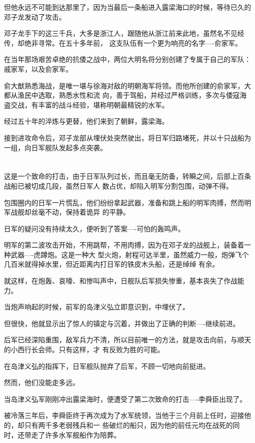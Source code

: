 \documentclass[11pt,a4paper,onecolumn]{article}
\begin{document}
但他永远不可能到达那里了，因为当最后一条船进入露梁海口的时候，等待已久的邓子龙发动了攻击。

邓子龙手下的这三千兵，大多是浙江人，跟随他从浙江前来此地，虽然名不见经传，却绝非寻常。在五十多年前，
这支队伍有一个更为响亮的名字----俞家军。

在当年那场艰苦卓绝的抗倭之战中，两位大明名将分别创建了专属于自己的军队：戚家军，以及俞家军。

俞大猷熟悉海战，是唯一堪与徐海对敌的明朝海军将领。而他所创建的俞家军，大都从渔民中选取，熟悉水性和流
向，善于驾船，并经过严格训练，多次与倭寇海盗交战，有丰富的战斗经验，堪称明朝最精锐的水军。

经过五十年的淬炼与更替，他们来到了朝鲜，露梁海。

接到进攻命令后，邓子龙部从埋伏处突然驶出，将日军归路堵死，并以十只战船为一组，向日军舰队发起多点突袭。

\section[\thesection]{}

这是一个致命的打击，由于日军队列过长，而且毫无防备，转瞬之间，后部上百条战船已被切成几段，虽然日军人
数占优，却陷入明军分割包围，动弹不得。

包围圈内的日军一片慌乱，他们纷纷拿起武器，准备和跳上船的明军肉搏，然而明军战舰却丝毫不动，保持着诡异
的平静。

日军的疑问没有持续太久，便听到了答案----可怕的轰鸣声。

明军的第二波攻击开始，不用跳帮，不用肉搏，因为在邓子龙的战舰上，装备着一种武器----虎蹲炮。这是一种大
型火炮，射程可达半里，虽然威力一般，炮弹飞个几百米就得掉水里，但近距离内打日军的铁皮木头船，还是绰绰
有余。

就这样，在炮轰、哀嚎、和惨叫声中，日舰队后军损失惨重，基本丧失了作战能力。

当炮声响起的时候，前军的岛津义弘立即意识到，中埋伏了。

但很快，他就显示出了惊人的镇定与沉着，并做出了正确的判断----继续前进。

后军已经深陷重围，敌军兵力不清，所以目前唯一的方法，就是攻击向前，与顺天的小西行长会师。只有这样，才
有反败为胜的可能。

在岛津义弘的指挥下，日军舰队抛弃了后军，不顾一切地向前挺进。

然而，他们没能走多远。

当岛津义弘军刚刚冲出露梁海时，便遭受了第二次致命的打击----李舜臣出现了。

被冷落三年后，李舜臣终于再次成为了水军统领，当他于三个月前上任时，迎接他的，却只有两千多老弱残兵和一
些破烂的船只，因为他的前任元均在战死的同时，还带走了许多水军舰船作为陪葬。
\end{document}
